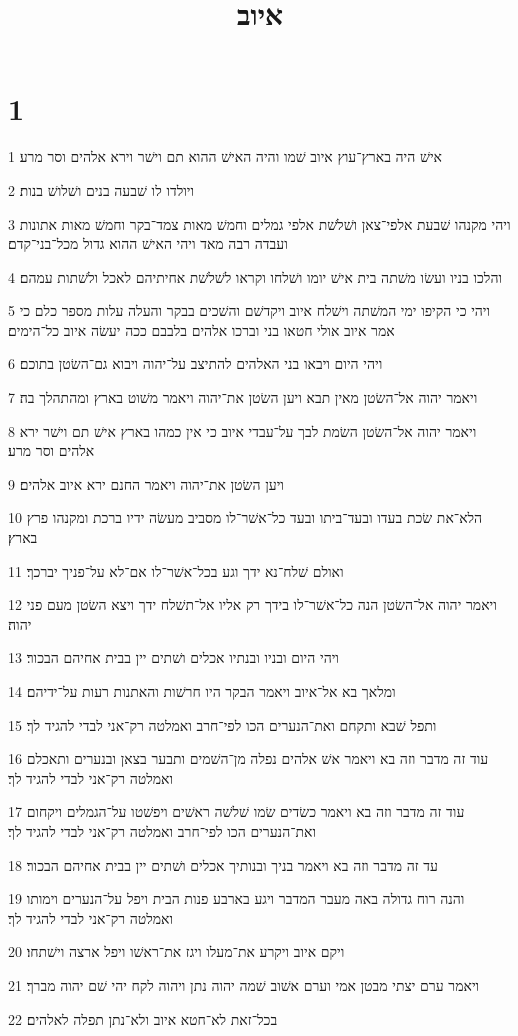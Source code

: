 

\title{איוב}


\chapter{1}

\par 1 אישׁ היה בארץ־עוץ איוב שׁמו והיה האישׁ ההוא תם וישׁר וירא אלהים וסר מרע׃
\par 2 ויולדו לו שׁבעה בנים ושׁלושׁ בנות׃
\par 3 ויהי מקנהו שׁבעת אלפי־צאן ושׁלשׁת אלפי גמלים וחמשׁ מאות צמד־בקר וחמשׁ מאות אתונות ועבדה רבה מאד ויהי האישׁ ההוא גדול מכל־בני־קדם׃
\par 4 והלכו בניו ועשׂו משׁתה בית אישׁ יומו ושׁלחו וקראו לשׁלשׁת אחיתיהם לאכל ולשׁתות עמהם׃
\par 5 ויהי כי הקיפו ימי המשׁתה וישׁלח איוב ויקדשׁם והשׁכים בבקר והעלה עלות מספר כלם כי אמר איוב אולי חטאו בני וברכו אלהים בלבבם ככה יעשׂה איוב כל־הימים׃
\par 6 ויהי היום ויבאו בני האלהים להתיצב על־יהוה ויבוא גם־השׂטן בתוכם׃
\par 7 ויאמר יהוה אל־השׂטן מאין תבא ויען השׂטן את־יהוה ויאמר משׁוט בארץ ומהתהלך בה׃
\par 8 ויאמר יהוה אל־השׂטן השׂמת לבך על־עבדי איוב כי אין כמהו בארץ אישׁ תם וישׁר ירא אלהים וסר מרע׃
\par 9 ויען השׂטן את־יהוה ויאמר החנם ירא איוב אלהים׃
\par 10 הלא־את שׂכת בעדו ובעד־ביתו ובעד כל־אשׁר־לו מסביב מעשׂה ידיו ברכת ומקנהו פרץ בארץ׃
\par 11 ואולם שׁלח־נא ידך וגע בכל־אשׁר־לו אם־לא על־פניך יברכך׃
\par 12 ויאמר יהוה אל־השׂטן הנה כל־אשׁר־לו בידך רק אליו אל־תשׁלח ידך ויצא השׂטן מעם פני יהוה׃
\par 13 ויהי היום ובניו ובנתיו אכלים ושׁתים יין בבית אחיהם הבכור׃
\par 14 ומלאך בא אל־איוב ויאמר הבקר היו חרשׁות והאתנות רעות על־ידיהם׃
\par 15 ותפל שׁבא ותקחם ואת־הנערים הכו לפי־חרב ואמלטה רק־אני לבדי להגיד לך׃
\par 16 עוד זה מדבר וזה בא ויאמר אשׁ אלהים נפלה מן־השׁמים ותבער בצאן ובנערים ותאכלם ואמלטה רק־אני לבדי להגיד לך׃
\par 17 עוד זה מדבר וזה בא ויאמר כשׂדים שׂמו שׁלשׁה ראשׁים ויפשׁטו על־הגמלים ויקחום ואת־הנערים הכו לפי־חרב ואמלטה רק־אני לבדי להגיד לך׃
\par 18 עד זה מדבר וזה בא ויאמר בניך ובנותיך אכלים ושׁתים יין בבית אחיהם הבכור׃
\par 19 והנה רוח גדולה באה מעבר המדבר ויגע בארבע פנות הבית ויפל על־הנערים וימותו ואמלטה רק־אני לבדי להגיד לך׃
\par 20 ויקם איוב ויקרע את־מעלו ויגז את־ראשׁו ויפל ארצה וישׁתחו׃
\par 21 ויאמר ערם יצתי מבטן אמי וערם אשׁוב שׁמה יהוה נתן ויהוה לקח יהי שׁם יהוה מברך׃
\par 22 בכל־זאת לא־חטא איוב ולא־נתן תפלה לאלהים׃

